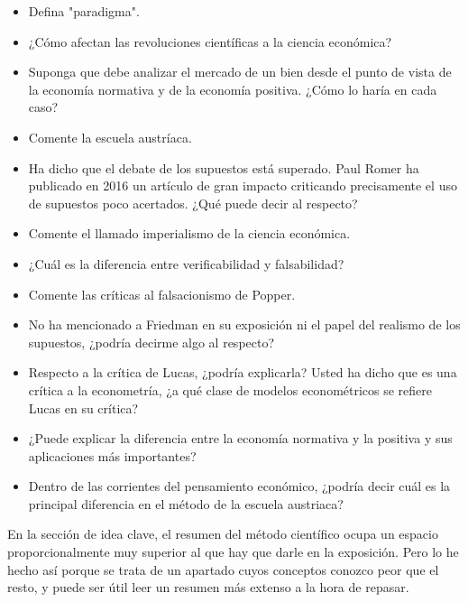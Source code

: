 \documentclass{nuevotema}
\begin{document}
\preguntas
{}
\begin{itemize}
    \item Defina "paradigma".
    \item ¿Cómo afectan las revoluciones científicas a la ciencia económica?
    \item Suponga que debe analizar el mercado de un bien desde el punto de vista de la economía normativa y de la economía positiva. ¿Cómo lo haría en cada caso?
    \item Comente la escuela austríaca.
    \item Ha dicho que el debate de los supuestos está superado. Paul Romer ha publicado en 2016 un artículo de gran impacto criticando precisamente el uso de supuestos poco acertados. ¿Qué puede decir al respecto?
    \item Comente el llamado imperialismo de la ciencia económica.
    \item ¿Cuál es la diferencia entre verificabilidad y falsabilidad?
    \item Comente las críticas al falsacionismo de Popper.
\end{itemize}

\begin{itemize}
    \item No ha mencionado a Friedman en su exposición ni el papel del realismo de los supuestos, ¿podría decirme algo al respecto?
    
    \item Respecto a la crítica de Lucas, ¿podría explicarla? Usted ha dicho que es una crítica a la econometría, ¿a qué clase de modelos econométricos se refiere Lucas en su crítica?
    
    \item ¿Puede explicar la diferencia entre la economía normativa y la positiva y sus aplicaciones más importantes?
    
    \item Dentro de las corrientes del pensamiento económico, ¿podría decir cuál es la principal diferencia en el método de la escuela austriaca?
\end{itemize}

\notas

En la sección de idea clave, el resumen del método científico ocupa un espacio proporcionalmente muy superior al que hay que darle en la exposición. Pero lo he hecho así porque se trata de un apartado cuyos conceptos conozco peor que el resto, y puede ser útil leer un resumen más extenso a la hora de repasar.
\end{document}
